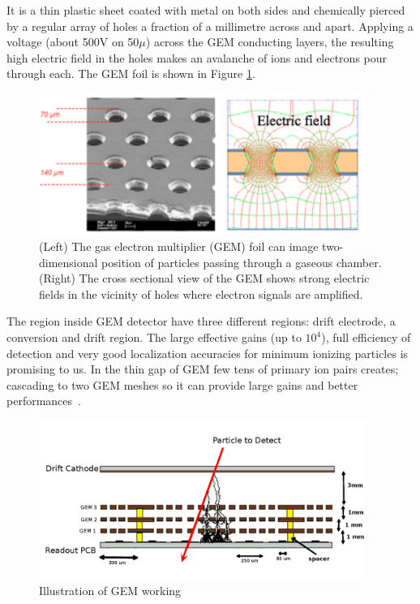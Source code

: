 It is a thin plastic sheet coated with metal on both sides and chemically pierced by a regular array of holes a fraction of a millimetre across and apart. Applying a voltage (about 500V on 50$\mu$) across the GEM conducting layers, the resulting high electric field in the holes makes an avalanche of ions and electrons pour through each. The GEM foil is shown in Figure \ref{fig:gem}.
\begin{figure}[!htbp]
	\centering
	\includegraphics[width=0.95\textwidth]{figures/GEM/KEKDTP3.jpg}
	\caption{(Left) The gas electron multiplier (GEM) foil can image two-dimensional position of particles passing through a gaseous chamber. (Right) The cross sectional view of the GEM shows strong electric fields in the vicinity of holes where electron signals are amplified.}
	\label{fig:gem}
\end{figure}
The region inside GEM detector have three different regions: drift electrode, a conversion and drift region.
The large effective gains (up to $10^4$), full efficiency of detection and very good localization accuracies for minimum ionizing particles is promising to us. In the thin gap of GEM few tens of primary ion pairs creates; cascading to two GEM meshes so it can provide large gains and better performances~\cite{Bressan1999}.
\begin{figure}[!htbp]
	\begin{center}
		\includegraphics[width=0.95\textwidth]{figures/GEM/triple_gem.png}
		\caption{Illustration of GEM working}
		\label{fig:gemgaps}
	\end{center}
\end{figure} 
